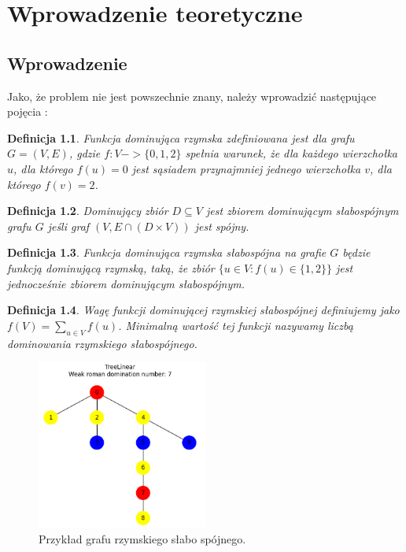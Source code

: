 \chapter{Wprowadzenie teoretyczne}

\section{Wprowadzenie}
Jako, że problem nie jest powszechnie znany, należy wprowadzić następujące pojęcia \cite{theoryWCRDF}:

\newtheorem{definition}{Definicja}

\begin{definition}
    Funkcja dominująca rzymska zdefiniowana jest dla grafu $G = (V, E)$, gdzie $f: V -> \{0,1,2\}$ spełnia warunek, że dla każdego wierzchołka $u$, dla którego $f(u) = 0$ jest sąsiadem przynajmniej jednego wierzchołka $v$, dla którego $f(v) = 2$.
\end{definition}

\begin{definition}
    Dominujący zbiór $D \subseteq V$ jest zbiorem dominującym słabospójnym grafu $G$ jeśli graf $(V,E \cap (D \times V))$ jest spójny.
\end{definition}

\begin{definition}
    Funkcja dominująca rzymska słabospójna na grafie $G$ będzie funkcją dominującą rzymską, taką, że zbiór $\{u \in V: f(u) \in \{1,2\}\}$ jest jednocześnie zbiorem dominującym słabospójnym.
\end{definition}

\begin{definition}
    Wagę funkcji dominującej rzymskiej słabospójnej definiujemy jako $f(V) = \sum_{u \in V}{f(u)}$. Minimalną wartość tej funkcji nazywamy liczbą dominowania rzymskiego słabospójnego. 
\end{definition}

\begin{figure}[H]
    \centering
    \includegraphics[width=0.5\textwidth]{assets/phase2.png}
    \caption{Przykład grafu rzymskiego słabo spójnego.}
    \label{fig:przykladWCRDF}
\end{figure}

